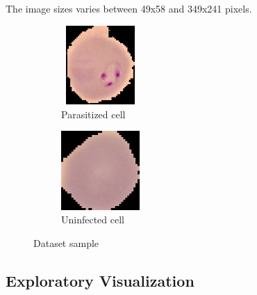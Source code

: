 \documentclass{article}
\begin{document}
	\medskip
	The image sizes varies between 49x58 and 349x241 pixels.
	
	\begin{figure}[h!]
		\centering
		\begin{subfigure}[b]{0.4\linewidth}
			\centering
			\captionsetup{justification=centering}
			\includegraphics[width=3cm, height=3cm]{parasitized.png}
			\caption{Parasitized cell}
		\end{subfigure}\quad
		\begin{subfigure}[b]{0.4\linewidth}
			\centering
			\captionsetup{justification=centering}
			\includegraphics[width=3cm, height=3cm]{uninfected.png}
			\caption{Uninfected cell}
		\end{subfigure}
		\caption{Dataset sample}
		\label{fig:cells}
	\end{figure}

	\subsection{Exploratory Visualization}
	
	
\end{document}
